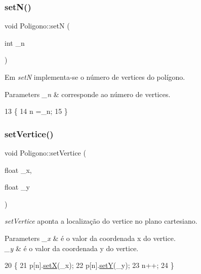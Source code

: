 \subsubsection{\texorpdfstring{set\+N()}{setN()}}
{\footnotesize\ttfamily void Poligono\+::setN (\begin{DoxyParamCaption}\item[{int}]{\+\_\+n }\end{DoxyParamCaption})}



Em {\itshape setN} implementa-\/se o número de vertices do polígono. 


\begin{DoxyParams}{Parameters}
{\em \+\_\+n} & corresponde ao número de vertices. \\
\hline
\end{DoxyParams}

\begin{DoxyCode}
13 \{
14     n =\_n;
15 \}
\end{DoxyCode}
\mbox{\label{class_poligono_a0784e2fb0149f6923a42bfabfb073719}} 
\subsubsection{\texorpdfstring{set\+Vertice()}{setVertice()}}
{\footnotesize\ttfamily void Poligono\+::set\+Vertice (\begin{DoxyParamCaption}\item[{float}]{\+\_\+x,  }\item[{float}]{\+\_\+y }\end{DoxyParamCaption})}



{\itshape set\+Vertice} aponta a localização do vertice no plano cartesiano. 


\begin{DoxyParams}{Parameters}
{\em \+\_\+x} & é o valor da coordenada x do vertice. \\
\hline
{\em \+\_\+y} & é o valor da coordenada y do vertice. \\
\hline
\end{DoxyParams}

\begin{DoxyCode}
20                                            \{
21     p[n].\hyperlink{class_point_a428a1676e2fdec6753c42011a1d59d18}{setX}(\_x);
22     p[n].\hyperlink{class_point_a9868c4601b0ea0c2d0de20fe41ee0e49}{setY}(\_y);
23     n++;
24 \}
\end{DoxyCode}
\mbox{\label{class_poligono_a4d757f52ba9366ab13537fb19b363e1e}} 
